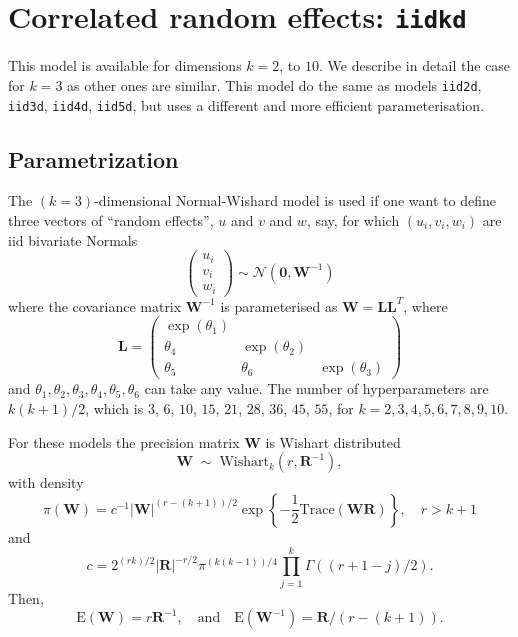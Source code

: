 \documentclass[a4paper,11pt]{article}
\begin{document}
\section*{Correlated random effects: \texttt{iidkd}}

This model is available for dimensions $k=2$, to $10$. We describe in
detail the case for $k=3$ as other ones are similar. This model do the
same as models \texttt{iid2d}, \texttt{iid3d}, \texttt{iid4d},
\texttt{iid5d}, but uses a different and more efficient parameterisation. 

\subsection*{Parametrization}

The $(k=3)$-dimensional Normal-Wishard model is used if one want to define
three vectors of ``random effects'', $u$ and $v$ and $w$, say, for which
$(u_{i}, v_{i}, w_i)$ are iid bivariate Normals
\begin{displaymath}
    \left(
      \begin{array}{c}
        u_{i}\\
        v_{i}\\
        w_{i}
      \end{array}\right)
    \sim \mathcal{N}\left(\mathbf{0}, \mathbf{W}^{-1}\right)
\end{displaymath}
where the  covariance matrix $\mathbf{W}^{-1}$ is parameterised as
$\mathbf{W}=\mathbf{L}\mathbf{L}^{T}$, where
\begin{equation}
    \label{precision}
    \mathbf{L} = \left(\begin{array}{ccc}
                         \exp(\theta_1) & & \\
                         \theta_4 & \exp(\theta_2) & \\
                         \theta_5 & \theta_6 & \exp(\theta_3)
      \end{array}\right)
\end{equation}
and $\theta_1, \theta_2, \theta_3, \theta_4, \theta_5, \theta_6$ can
take any value. The number of hyperparameters are $k(k+1)/2$, which is
$3$, $6$, $10$, $15$, $21$, $28$, $36$, $45$, $55$, for
$k=2, 3, 4, 5, 6, 7, 8, 9, 10$.

For these models the precision matrix $\mathbf{W}$ is Wishart
distributed
\begin{displaymath}
    \mathbf{W}
    \;\sim\;\text{Wishart}_{k}(r, \mathbf{R}^{-1}), 
\end{displaymath}
with density
\begin{displaymath}
    \pi(\mathbf{W}) = c^{-1} |\mathbf{W}|^{(r-(k+1))/2} \exp\left\{
      -\frac{1}{2}\text{Trace}(\mathbf{W}\mathbf{R})\right\}, \quad r > k+1
\end{displaymath}
and
\begin{displaymath}
    c = 2^{(rk)/2} |\mathbf{R}|^{-r/2} \pi^{(k(k-1))/4}\prod_{j=1}^{k}
    \Gamma((r+1-j)/2).
\end{displaymath}
Then,
\begin{displaymath}
    \text{E}(\mathbf{W}) = r\mathbf{R}^{-1}, \quad\text{and}\quad
    \text{E}(\mathbf{W}^{-1}) = \mathbf{R}/(r-(k+1)).
\end{displaymath}
\end{document}
